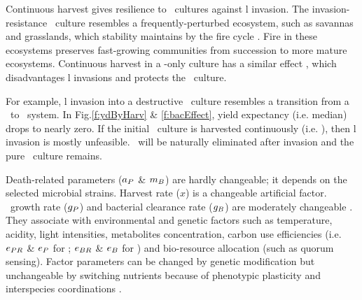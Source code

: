 \documentclass[../thesis.tex]{subfiles} %
\begin{document}
Continuous harvest gives resilience to \phy\ cultures against \bac l invasion.  The invasion-resistance \phy\ culture resembles a frequently-perturbed ecosystem, such as savannas and grasslands, which stability maintains by the fire cycle \autocite{dass2018grasslands,trollope1984fire}.  Fire in these ecosystems preserves fast-growing communities \autocite{trollope1984fire} from succession to more mature ecosystems.  Continuous harvest in a \phy-only culture has a similar effect \autocite{sharp2017robust}, which disadvantages \bac l invasions and protects the \phy\ culture.

For example, \bac l invasion into a destructive \phy\ culture resembles a transition from a \PoN\ to \PBN\ system.  In Fig.\ref{f:ydByHarv} \& \ref{f:bacEffect}, yield expectancy (i.e. median) drops to nearly zero.  If the initial \phy\ culture is harvested continuously (i.e. \PoH), then \bac l invasion is mostly unfeasible.  \Bac\ will be naturally eliminated after invasion and the pure \phy\ culture remains.

Death-related parameters ($a_P$ \& $m_B$) are hardly changeable; it depends on the selected microbial strains.  Harvest rate ($x$) is a changeable artificial factor.  \Phy\ growth rate ($g_P$) and bacterial clearance rate ($g_B$) are moderately changeable \autocite{park2020potential}.  They associate with environmental and genetic factors such as temperature, acidity, light intensities, metabolites concentration, carbon use efficiencies (i.e. $e_{PR}$ \& $e_P$ for \phy; $e_{BR}$ \& $e_B$ for \bac) and bio-resource allocation (such as quorum sensing).  Factor parameters can be changed by genetic modification \autocite{moniruzzaman1996ethanol} but unchangeable by switching nutrients because of phenotypic plasticity \autocite{j1989respiration,bratbak1985phytoplankton,samejima1958heterotrophic} and interspecies coordinations \autocite{beliaev2014inference,amin2012interactions}.
\end{document}
